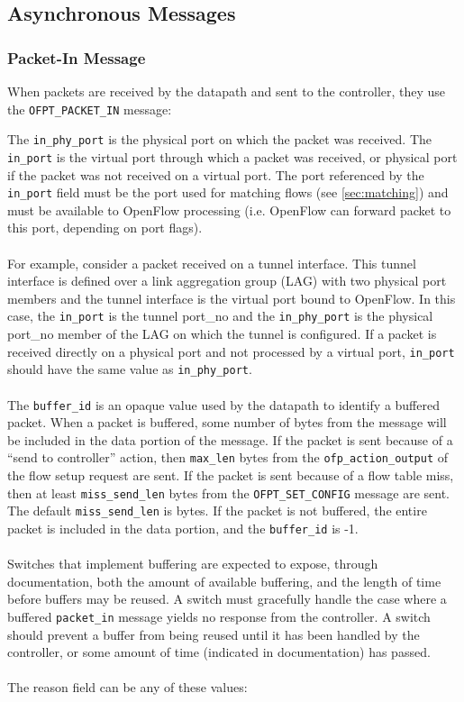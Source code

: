 \subsection{Asynchronous Messages}
\subsubsection{Packet-In Message}
When packets are received by the datapath and sent to the controller, they use the \verb|OFPT_PACKET_IN| message:


The \verb|in_phy_port| is the physical port on which the packet was received. The \verb|in_port| is the virtual port through which a packet was received, or physical port if the packet was not received on a virtual port. The port referenced by the \verb|in_port| field must be the port used for matching flows (see \ref{sec:matching}) and must be available to OpenFlow processing (i.e. OpenFlow can forward packet to this port, depending on port flags).
\\\\
For example, consider a packet received on a tunnel interface.  This tunnel interface is defined over a link aggregation group (LAG) with two physical port members and the tunnel interface is the virtual port bound to OpenFlow.  In this case, the \verb|in_port| is the tunnel port\_no and the \verb|in_phy_port| is the physical port\_no member of the LAG on which the tunnel is configured. If a packet is received directly on a physical port and not processed by a virtual port, \verb|in_port| should have the same value as \verb|in_phy_port|.
\\\\
The \verb|buffer_id| is an opaque value used by the datapath to identify a buffered packet.  When a packet is buffered, some number of bytes from the message will be included in the data portion of the message.  If the packet is sent because of a ``send to controller'' action, then \verb|max_len| bytes from the \verb|ofp_action_output| of the flow setup request are sent.  If the packet is sent because of a flow table miss, then at least \verb|miss_send_len| bytes from the \verb|OFPT_SET_CONFIG| message are sent.  The default \verb|miss_send_len| is bytes.  If the packet is not buffered, the entire packet is included in the data portion, and the \verb|buffer_id| is -1.  
\\\\
Switches that implement buffering are expected to expose, through documentation, both the amount of available buffering, and the length of time before buffers may be reused.  A switch must gracefully handle the case where a buffered \verb|packet_in| message yields no response from the controller.  A switch should prevent a buffer from being reused until it has been handled by the controller, or some amount of time (indicated in documentation) has passed.
\\\\
The reason field can be any of these values:

